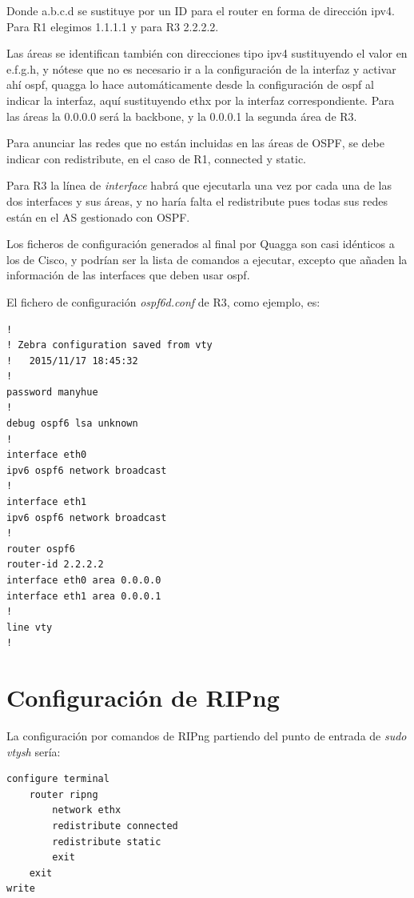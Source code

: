 \documentclass{article}
\begin{document}
Donde a.b.c.d se sustituye por un ID para el router en forma de dirección ipv4. Para R1 elegimos 1.1.1.1 y para R3 2.2.2.2.

Las áreas se identifican también con direcciones tipo ipv4 sustituyendo el valor en e.f.g.h, y nótese que no es necesario ir a la configuración de la interfaz y activar ahí ospf, quagga lo hace automáticamente desde la configuración de ospf al indicar la interfaz, aquí sustituyendo ethx por la interfaz correspondiente. Para las áreas la 0.0.0.0 será la backbone, y la 0.0.0.1 la segunda área de R3.

Para anunciar las redes que no están incluidas en las áreas de OSPF, se debe indicar con redistribute, en el caso de R1, connected y static.

Para R3 la línea de \textit{interface} habrá que ejecutarla una vez por cada una de las dos interfaces y sus áreas, y no haría falta el redistribute pues todas sus redes están en el AS gestionado con OSPF.

\hfill

Los ficheros de configuración generados al final por Quagga son casi idénticos a los de Cisco, y podrían ser la lista de comandos a ejecutar, excepto que añaden la información de las interfaces que deben usar ospf.

\hfil

El fichero de configuración \textit{ospf6d.conf} de R3, como ejemplo, es:

\begin{lstlisting}
!
! Zebra configuration saved from vty
!   2015/11/17 18:45:32
!
password manyhue
!
debug ospf6 lsa unknown
!
interface eth0
ipv6 ospf6 network broadcast
!
interface eth1
ipv6 ospf6 network broadcast
!
router ospf6
router-id 2.2.2.2
interface eth0 area 0.0.0.0
interface eth1 area 0.0.0.1
!
line vty
!
\end{lstlisting}


\section{Configuración de RIPng}

La configuración por comandos de RIPng partiendo del punto de entrada de \textit{sudo vtysh} sería:

\hfil

\begin{BVerbatim}
configure terminal
	router ripng
		network ethx
		redistribute connected
		redistribute static
		exit
	exit
write
\end{BVerbatim}
\end{document}
